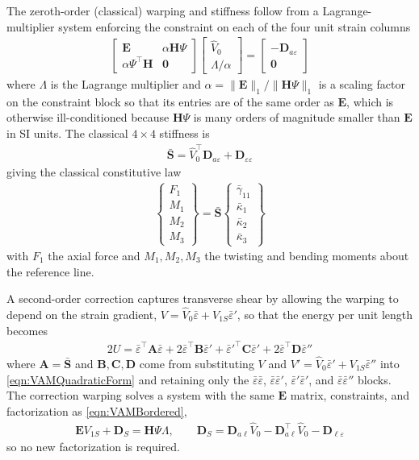 \documentclass[10pt]{article}
\newcommand{\mbf}[1]{\mathbf{#1}}
\newcommand{\beq}{\begin{equation}\begin{aligned}}
\newcommand{\eeq}{\end{aligned}\end{equation}}
\begin{document}
The zeroth-order (classical) warping and stiffness follow from a Lagrange-multiplier system enforcing the constraint on each of the four unit strain columns \citep[Eqs.~(4.44)--(4.51)]{Hodges2006}
\beq
\begin{bmatrix}
\mbf{E} & \alpha \mbf{H}\Psi \\
\alpha \Psi^\top \mbf{H} & \mbf{0}
\end{bmatrix}
\begin{bmatrix}
\hat V_0 \\ \Lambda/\alpha
\end{bmatrix}
=
\begin{bmatrix}
-\mbf{D}_{a\varepsilon} \\ \mbf{0}
\end{bmatrix}
\label{eqn:VAMBordered}
\eeq
where $\Lambda$ is the Lagrange multiplier and $\alpha = \|\mbf{E}\|_1 / \|\mbf{H}\Psi\|_1$ is a scaling factor on the constraint block so that its entries are of the same order as $\mbf{E}$, which is otherwise ill-conditioned because $\mbf{H}\Psi$ is many orders of magnitude smaller than $\mbf{E}$ in SI units.
The classical $4\times4$ stiffness is
\beq
\bar{\mbf{S}} = \hat V_0^\top \mbf{D}_{a\varepsilon} + \mbf{D}_{\varepsilon\varepsilon}
\label{eqn:VAMClassicalStiffness}
\eeq
giving the classical constitutive law
\beq
\begin{Bmatrix} F_1 \\ M_1 \\ M_2 \\ M_3 \end{Bmatrix}
=
\bar{\mbf{S}}
\begin{Bmatrix} \bar\gamma_{11} \\ \bar\kappa_1 \\ \bar\kappa_2 \\ \bar\kappa_3 \end{Bmatrix}
\label{eqn:VAMClassicalConstitutive}
\eeq
with $F_1$ the axial force and $M_1, M_2, M_3$ the twisting and bending moments about the reference line.

A second-order correction captures transverse shear by allowing the warping to depend on the strain gradient, $V = \hat V_0 \bar\varepsilon + V_{1S} \bar\varepsilon'$, so that the energy per unit length becomes \citep[Eqs.~(4.55)--(4.61)]{Hodges2006}
\beq
2U = \bar\varepsilon^\top \mbf{A} \bar\varepsilon + 2 \bar\varepsilon^\top \mbf{B} \bar\varepsilon' + \bar\varepsilon'^\top \mbf{C} \bar\varepsilon' + 2 \bar\varepsilon^\top \mbf{D} \bar\varepsilon''
\label{eqn:VAMSecondOrderEnergy}
\eeq
where $\mbf{A} = \bar{\mbf{S}}$ and $\mbf{B}, \mbf{C}, \mbf{D}$ come from substituting $V$ and $V' = \hat V_0 \bar\varepsilon' + V_{1S}\bar\varepsilon''$ into \autoref{eqn:VAMQuadraticForm} and retaining only the $\bar\varepsilon\bar\varepsilon$, $\bar\varepsilon\bar\varepsilon'$, $\bar\varepsilon'\bar\varepsilon'$, and $\bar\varepsilon\bar\varepsilon''$ blocks.
The correction warping solves a system with the same $\mbf{E}$ matrix, constraints, and factorization as \autoref{eqn:VAMBordered},
\beq
\mbf{E} V_{1S} + \mbf{D}_S = \mbf{H}\Psi\Lambda, \qquad \mbf{D}_S = \mbf{D}_{a\ell}\hat V_0 - \mbf{D}_{a\ell}^\top \hat V_0 - \mbf{D}_{\ell\varepsilon}
\label{eqn:VAMSecondOrderWarping}
\eeq
so no new factorization is required.
\end{document}
